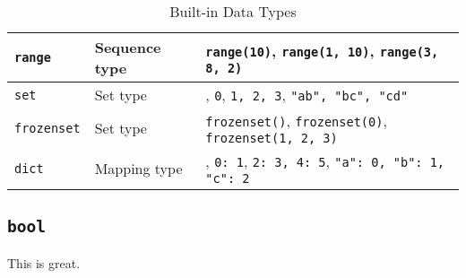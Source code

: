 \begin{table}[H]
\begin{tabular}{p{0.15\linewidth}p{0.25\linewidth}p{0.60\linewidth}}
        \texttt{range} & Sequence type & \texttt{range(10)},
                                                     \texttt{range(1, 10)},
                                                     \texttt{range(3, 8, 2)}}\\
        \midrule

        \texttt{set} & Set type & \texttt{{}},
                                              \texttt{{0}},
                                              \texttt{{1, 2, 3}},
                                              \texttt{{"ab", "bc", "cd"}}\\
        \midrule

        \texttt{frozenset} & Set type & \texttt{frozenset({})},
                                                    \texttt{frozenset({0})},
                                                    \texttt{frozenset({1, 2, 3})}\\
        \midrule

        \texttt{dict} & Mapping type & \texttt{{}},
                                                   \texttt{{0: 1}},
                                                   \texttt{{2: 3, 4: 5}},
                                                   \texttt{{"a": 0, "b": 1, "c": 2}}\\
        \bottomrule
    \end{tabular}
    \caption{Built-in Data Types}
    \label{tb.data.types}
\end{table}

\subsection{\texttt{bool}}

This is great.
